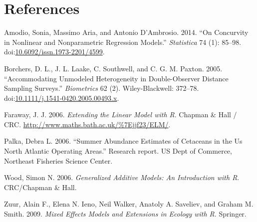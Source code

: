\documentclass[]{book}
\theoremstyle{definition}
\theoremstyle{definition}
\theoremstyle{remark}
\begin{document}
\chapter*{References}\label{references}

\hypertarget{refs}{}
\hypertarget{ref-Amodio2014}{}
Amodio, Sonia, Massimo Aria, and Antonio D'Ambrosio. 2014. ``On
Concurvity in Nonlinear and Nonparametric Regression Models.''
\emph{Statistica} 74 (1): 85--98.
doi:\href{https://doi.org/10.6092/issn.1973-2201/4599}{10.6092/issn.1973-2201/4599}.

\hypertarget{ref-Borchers_2005}{}
Borchers, D. L., J. L. Laake, C. Southwell, and C. G. M. Paxton. 2005.
``Accommodating Unmodeled Heterogeneity in Double-Observer Distance
Sampling Surveys.'' \emph{Biometrics} 62 (2). Wiley-Blackwell: 372--78.
doi:\href{https://doi.org/10.1111/j.1541-0420.2005.00493.x}{10.1111/j.1541-0420.2005.00493.x}.

\hypertarget{ref-Faraway2006}{}
Faraway, J. J. 2006. \emph{Extending the Linear Model with R}. Chapman
\& Hall / CRC. \url{http://www.maths.bath.ac.uk/\%7Ejjf23/ELM/}.

\hypertarget{ref-Palka2006}{}
Palka, Debra L. 2006. ``Summer Abundance Estimates of Cetaceans in the
Us North Atlantic Operating Areas.'' Research report. US Dept of
Commerce, Northeast Fisheries Science Center.

\hypertarget{ref-Wood2006}{}
Wood, Simon N. 2006. \emph{Generalized Additive Models: An Introduction
with R}. CRC/Chapman \& Hall.

\hypertarget{ref-Zuur2009b}{}
Zuur, Alain F., Elena N. Ieno, Neil Walker, Anatoly A. Saveliev, and
Graham M. Smith. 2009. \emph{Mixed Effects Models and Extensions in
Ecology with R}. Springer.
\end{document}
